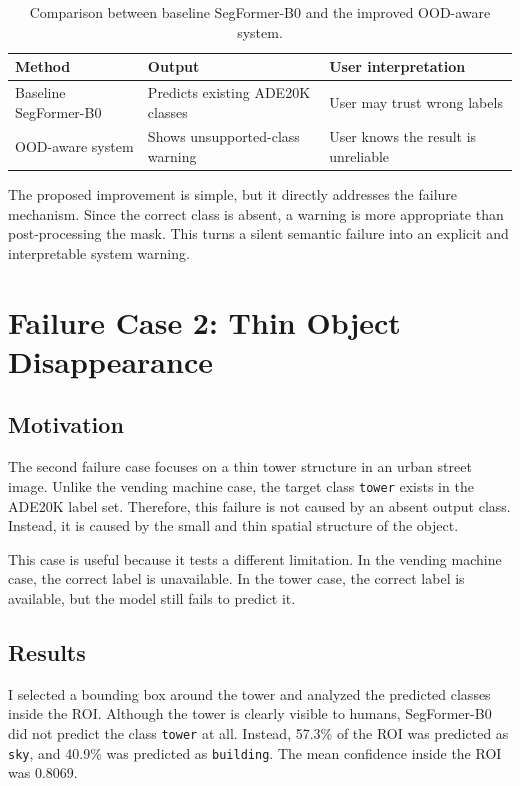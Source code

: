 \documentclass[10pt,a4paper]{article}
\begin{document}
\begin{table}[H]
\centering
\caption{Comparison between baseline SegFormer-B0 and the improved OOD-aware system.}
\begin{tabular}{lll}
\toprule
Method & Output & User interpretation \\
\midrule
Baseline SegFormer-B0 & Predicts existing ADE20K classes & User may trust wrong labels \\
OOD-aware system & Shows unsupported-class warning & User knows the result is unreliable \\
\bottomrule
\end{tabular}
\end{table}

The proposed improvement is simple, but it directly addresses the failure mechanism.
Since the correct class is absent, a warning is more appropriate than post-processing the mask.
This turns a silent semantic failure into an explicit and interpretable system warning.

\FloatBarrier

\section{Failure Case 2: Thin Object Disappearance}

\subsection{Motivation}

The second failure case focuses on a thin tower structure in an urban street image.
Unlike the vending machine case, the target class \texttt{tower} exists in the ADE20K label set.
Therefore, this failure is not caused by an absent output class.
Instead, it is caused by the small and thin spatial structure of the object.

This case is useful because it tests a different limitation.
In the vending machine case, the correct label is unavailable.
In the tower case, the correct label is available, but the model still fails to predict it.

\subsection{Results}

I selected a bounding box around the tower and analyzed the predicted classes inside the ROI.
Although the tower is clearly visible to humans, SegFormer-B0 did not predict the class \texttt{tower} at all.
Instead, 57.3\% of the ROI was predicted as \texttt{sky}, and 40.9\% was predicted as \texttt{building}.
The mean confidence inside the ROI was 0.8069.
\end{document}
